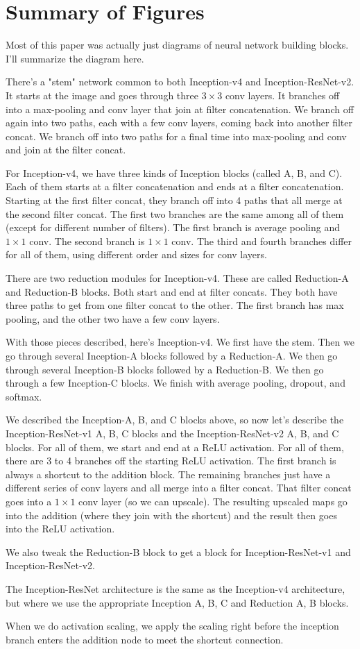 \documentclass[a4paper]{article}
\begin{document}
\section{Summary of Figures}
Most of this paper was actually just diagrams of neural network building blocks.
I'll summarize the diagram here.

There's a "stem" network common to both Inception-v4 and Inception-ResNet-v2.
It starts at the image and goes through three $3 \times 3$ conv layers. It
branches off into a max-pooling and conv layer that join at filter
concatenation. We branch off again into two paths, each with a few conv layers,
coming back into another filter concat. We branch off into two paths for
a final time into max-pooling and conv and join at the filter concat.

For Inception-v4, we have three kinds of Inception blocks (called A, B, and C).
Each of them starts at a filter concatenation and ends at a filter concatenation.
Starting at the first filter concat, they branch off into 4 paths that all
merge at the second filter concat. The first two branches are the same among all
of them (except for different number of filters). The first branch is average
pooling and $1 \times 1$ conv. The second branch is $1 \times 1$ conv. The
third and fourth branches differ for all of them, using different order and
sizes for conv layers.

There are two reduction modules for Inception-v4. These are
called Reduction-A and Reduction-B blocks. Both start and end at
filter concats. They both have three paths to get from one filter concat
to the other. The first branch has max pooling, and the other two have
a few conv layers.

With those pieces described, here's Inception-v4. We first have the stem.
Then we go through several Inception-A blocks followed by a Reduction-A.
We then go through several Inception-B blocks followed by a Reduction-B.
We then go through a few Inception-C blocks. We finish with average pooling,
dropout, and softmax.

We described the Inception-A, B, and C blocks above, so now let's describe the
Inception-ResNet-v1 A, B, C blocks and the Inception-ResNet-v2 A, B, and C
blocks. For all of them, we start and end
at a ReLU activation. For all of them, there are 3 to 4 branches off the
starting ReLU activation. The first branch is always a shortcut to the
addition block. The remaining branches just have a different series of conv
layers and all merge into a filter concat. That filter concat goes into a
$1 \times 1$ conv layer (so we can upscale). The resulting upscaled maps
go into the addition (where they join with the shortcut) and the result
then goes into the ReLU activation.

We also tweak the Reduction-B block to get a block for Inception-ResNet-v1
and Inception-ResNet-v2.

The Inception-ResNet architecture is the same as the Inception-v4 architecture,
but where we use the appropriate Inception A, B, C and Reduction A, B blocks.

When we do activation scaling, we apply the scaling right before the inception
branch enters the addition node to meet the shortcut connection.
\end{document}

